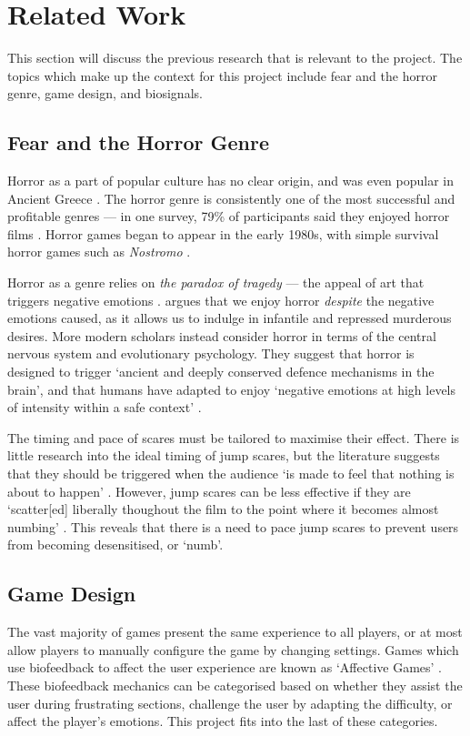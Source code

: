 \documentclass[12pt,a4paper]{article}\usepackage[]{graphicx}\usepackage[]{color}
\begin{document}
\section{Related Work}

This section will discuss the previous research that is relevant to the project. 
The topics which make up the context for this project include fear and the horror genre, game design, and biosignals.

\subsection{Fear and the Horror Genre}
Horror as a part of popular culture has no clear origin, and was even popular in Ancient Greece \citep{jackson81}.
The horror genre is consistently one of the most successful and profitable genres \citep{prince04} --- in one survey, 79\% of participants said they enjoyed horror films \citep{johansen13}.
Horror games began to appear in the early 1980s, with simple survival horror games such as \emph{Nostromo} \citep{szczepaniak14}.

Horror as a genre relies on \emph{the paradox of tragedy} --- the appeal of art that triggers negative emotions \citep{smuts09}.
\cite{freud19} argues that we enjoy horror \emph{despite} the negative emotions caused, as it allows us to indulge in infantile and repressed murderous desires.
More modern scholars instead consider horror in terms of the central nervous system and evolutionary psychology.
They suggest that horror is designed to trigger `ancient and deeply conserved defence mechanisms in the brain', and that humans have adapted to enjoy `negative emotions at high levels of intensity within a safe context' \citep[p. 4]{clasen17}.

The timing and pace of scares must be tailored to maximise their effect.
There is little research into the ideal timing of jump scares, but the literature suggests that they should be triggered when the audience `is made to feel that nothing is about to happen' \citep[p. 52]{draven13}.
However, jump scares can be less effective if they are `scatter[ed] liberally thoughout the film to the point where it becomes almost numbing' \citep[p. 80]{rosenberg10}.
This reveals that there is a need to pace jump scares to prevent users from becoming desensitised, or `numb'.

\subsection{Game Design}
The vast majority of games present the same experience to all players, or at most allow players to manually configure the game by changing settings.
Games which use biofeedback to affect the user experience are known as `Affective Games' \citep{gilleade05}.
These biofeedback mechanics can be categorised based on whether they assist the user during frustrating sections, challenge the user by adapting the difficulty, or affect the player's emotions.
This project fits into the last of these categories.
\end{document}
